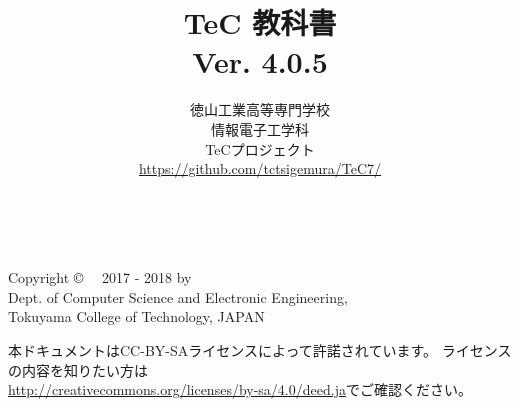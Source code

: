 \documentclass[a4paper,twocolumn,twoside,dvipdfmx]{jsbook}
\begin{document}
\frontmatter
\title{TeC 教科書\\Ver. 4.0.5}
\author{徳山工業高等専門学校\\情報電子工学科\\TeCプロジェクト\\
\url{https://github.com/tctsigemura/TeC7/}}
\date{}

\maketitle

\thispagestyle{empty}
\onecolumn
~
\vfill
\begin{flushleft}
Copyright \copyright ~~ 2017 - 2018 by \\
Dept. of Computer Science and Electronic Engineering, \\
Tokuyama College of Technology, JAPAN
\end{flushleft}

\vspace{0.8cm}
本ドキュメントはCC-BY-SAライセンスによって許諾されています。
ライセンスの内容を知りたい方は\\
\url{http://creativecommons.org/licenses/by-sa/4.0/deed.ja}でご確認ください。

\setcounter{tocdepth}{2}
\tableofcontents

\twocolumn
\mainmatter

\appendix

\backmatter
\pagestyle{empty}
\onecolumn
~
\vfill\vfill\vfill
\begin{center}
\end{center}
\vfill
\end{document}
